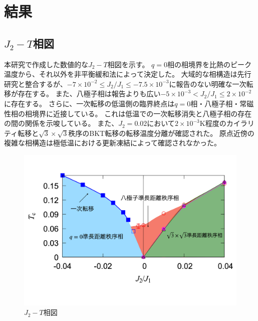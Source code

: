 \documentclass[12pt,titlepage,dvipdfmx]{jarticle}
\begin{document}
\section{結果}
\subsection{$J_2-T$相図}
本研究で作成した数値的な$J_2-T$相図を示す。
$q=0$相の相境界を比熱のピーク温度から、それ以外を非平衡緩和法によって決定した。
大域的な相構造は先行研究と整合するが、$-7\times10^{-2}\le J_2/J_1\le -7.5\times10^{-3}$に報告のない明確な一次転移が存在する。
また、八極子相は報告よりも広い$-5\times10^{-3}<J_2/J_1\le2\times10^{-2}$に存在する。
さらに、一次転移の低温側の臨界終点は$q=0$相・八極子相・常磁性相の相境界に近接している。
これは低温での一次転移消失と八極子相の存在の間の関係を示唆している。
また、$J_2=0.02$において$2\times10^{-3}\si{\kelvin}$程度のカイラリティ転移と$\sqrt{3}\times\sqrt{3}$秩序のBKT転移の転移温度分離が確認された。
原点近傍の複雑な相構造は極低温における更新凍結によって確認されなかった。
\begin{figure}[H]
   \centering
   \includegraphics[width=15cm]{figure/phase_diagram_broad.pdf}
   \caption{$J_2-T$相図}
\end{figure}
\end{document}
